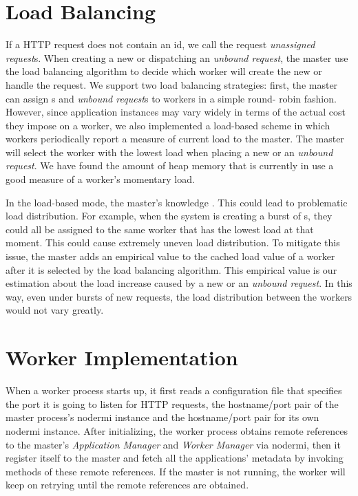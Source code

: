 \section{Load Balancing}
\label{sec:lb}


If a HTTP request does not contain an \appins id,
  we call the request \emph{unassigned request}s. When creating a new
\appins or  dispatching an \emph{unbound request}, the master use the load
balancing algorithm  to decide which worker will create the new \appins or
handle the request. We support two load balancing strategies: first, the
master can assign \appins{}s and \emph{unbound request}s to workers in a
simple round- robin fashion. However, since application instances may vary
widely in terms of the actual cost they impose on a worker, we also
implemented a load-based scheme in which workers periodically report a measure
of current load to the master. The master will select the worker with the
lowest load when placing a new \appins or an \emph{unbound request}.  We have
found the amount of heap memory that is currently in use a good measure of a
worker's  momentary load.

In the load-based mode, the master's knowledge 
. 
This could lead to problematic load distribution. For
example,  when the system is creating a burst of \appins{}s, they could all be
assigned to the same worker that has the lowest load at that moment.  This
could cause extremely uneven load distribution. To mitigate this issue, the
master adds an empirical value to the cached load value of a worker after it
is selected by the load balancing algorithm. This empirical value is our
estimation about the load increase caused by a new \appins or an \emph{unbound
request}. In this way, even under bursts of new requests,  the load
distribution between the workers would not vary greatly.


\section{Worker Implementation}
\label{sec:worker}

When a worker process starts up, it first reads a configuration file that
specifies the port it is going to listen for HTTP requests,  the hostname/port
pair of the master process's nodermi instance   and the hostname/port pair for
its own nodermi instance. After initializing, the worker process obtains
remote references to the master's \emph{Application Manager} and \emph{Worker
Manager} via nodermi, then it register itself to the master and fetch all the
applications' metadata by invoking methods of these remote references. If the
master is not running, the worker will keep on retrying until the remote
references are obtained.

